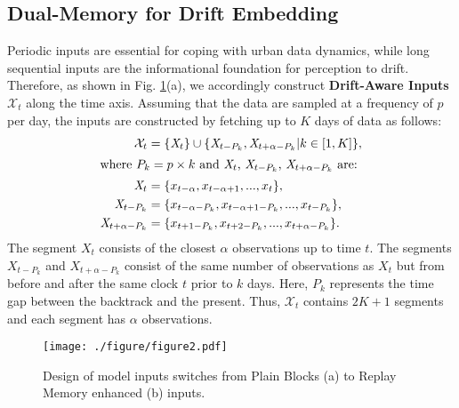 \documentclass[sigconf]{acmart}
\begin{document}
\subsection{Dual-Memory for Drift Embedding}
Periodic inputs are essential for coping with urban data dynamics, while long sequential inputs are the informational foundation for perception to drift. Therefore, as shown in Fig. \ref{fig:input_structure}(a), we accordingly construct \textbf{Drift-Aware Inputs} $\mathcal{X}_{t}$ along the time axis. Assuming that the data are sampled at a frequency of $p$ per day, the inputs are constructed by fetching up to $K$ days of data as follows:
\begin{align}
    \mathcal{X}_{t} &= \{\mathit{X}_t\} \cup \{\mathit{X}_{t-P_k}, \mathit{X}_{t+\alpha-P_k} | k \in [1, K]\}, \nonumber \\
    \intertext{where $P_k = p\times k$ and $\mathit{X}_t$, $\mathit{X}_{t-P_k}$, $\mathit{X}_{t+\alpha-P_k}$ are:}
    \mathit{X}_t &= \{x_{t-\alpha}, x_{t-\alpha+1}, ..., x_{t}\}, \nonumber \\
    \mathit{X}_{t-P_k} &= \{x_{t-\alpha-P_k}, x_{t-\alpha+1-P_k}, ..., x_{t-P_k}\}, \nonumber \\
    \mathit{X}_{t+\alpha-P_k} &= \{x_{t+1-P_k}, x_{t+2-P_k}, ..., x_{t+\alpha-P_k}\}.
\end{align}
The segment $\mathit{X}_t$ consists of the closest $\alpha$ observations up to time $t$. The segments $\mathit{X}_{t-P_k}$ and $\mathit{X}_{t+\alpha-P_k}$ consist of the same number of observations as $\mathit{X}_t$ but from before and after the same clock $t$ prior to $k$ days. Here, $P_k$ represents the time gap between the backtrack and the present. Thus, $\mathcal{X}_{t}$ contains $2K+1$ segments and  each segment has $\alpha$ observations.

\begin{figure}[h]
	\centering
	\texttt{[image: ./figure/figure2.pdf]}
	\caption{Design of model inputs switches from Plain Blocks (a) to Replay Memory enhanced (b) inputs.}
	\label{fig:input_structure}
\end{figure}
\end{document}
